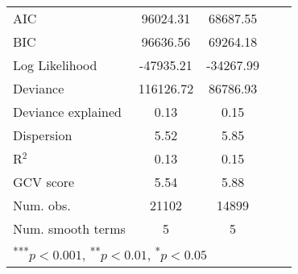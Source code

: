 \begin{tabular}{l c c c c}
\hline
AIC                & 96024.31                 & 68687.55                 \\
BIC                & 96636.56                 & 69264.18                 \\
Log Likelihood     & -47935.21                & -34267.99                \\
Deviance           & 116126.72                & 86786.93                 \\
Deviance explained & 0.13                     & 0.15                     \\
Dispersion         & 5.52                     & 5.85                     \\
R$^2$              & 0.13                     & 0.15                     \\
GCV score          & 5.54                     & 5.88                     \\
Num. obs.          & 21102                    & 14899                    \\
Num. smooth terms  & 5                        & 5                        \\
\hline
\multicolumn{3}{l}{\scriptsize{\textsuperscript{***}$p<0.001$, 
\textsuperscript{**}$p<0.01$, 
\textsuperscript{*}$p<0.05$}}
\end{tabular}

